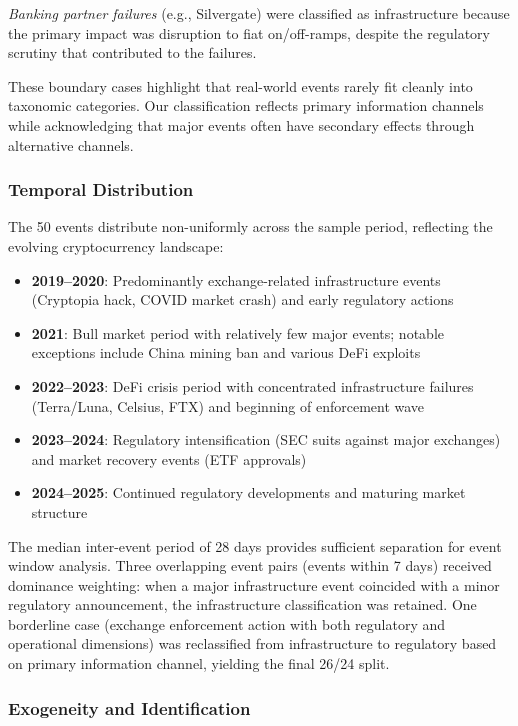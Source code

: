 \documentclass[pdflatex,sn-mathphys-num]{sn-jnl}
\theoremstyle{thmstyleone}
\theoremstyle{thmstyletwo}
\theoremstyle{thmstylethree}
\begin{document}
\textit{Banking partner failures} (e.g., Silvergate) were classified as infrastructure because the primary impact was disruption to fiat on/off-ramps, despite the regulatory scrutiny that contributed to the failures.

These boundary cases highlight that real-world events rarely fit cleanly into taxonomic categories. Our classification reflects primary information channels while acknowledging that major events often have secondary effects through alternative channels.

\subsubsection{Temporal Distribution}

The 50 events distribute non-uniformly across the sample period, reflecting the evolving cryptocurrency landscape:
\begin{itemize}[nosep]
\item \textbf{2019--2020}: Predominantly exchange-related infrastructure events (Cryptopia hack, COVID market crash) and early regulatory actions
\item \textbf{2021}: Bull market period with relatively few major events; notable exceptions include China mining ban and various DeFi exploits
\item \textbf{2022--2023}: DeFi crisis period with concentrated infrastructure failures (Terra/Luna, Celsius, FTX) and beginning of enforcement wave
\item \textbf{2023--2024}: Regulatory intensification (SEC suits against major exchanges) and market recovery events (ETF approvals)
\item \textbf{2024--2025}: Continued regulatory developments and maturing market structure
\end{itemize}

The median inter-event period of 28 days provides sufficient separation for event window analysis. Three overlapping event pairs (events within 7 days) received dominance weighting: when a major infrastructure event coincided with a minor regulatory announcement, the infrastructure classification was retained. One borderline case (exchange enforcement action with both regulatory and operational dimensions) was reclassified from infrastructure to regulatory based on primary information channel, yielding the final 26/24 split.

\subsubsection{Exogeneity and Identification}
\end{document}
